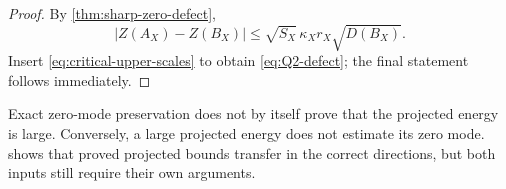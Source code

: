 \begin{proof}
By \cref{thm:sharp-zero-defect},
\[
 |Z(A_X)-Z(B_X)|
 \le
 \sqrt{S_X}\,\kappa_Xr_X\sqrt{D(B_X)}.
\]
Insert \eqref{eq:critical-upper-scales} to obtain
\eqref{eq:Q2-defect}; the final statement follows immediately.
\end{proof}

\begin{remark}
\label{rem:zero-energy-distinct}
Exact zero-mode preservation does not by itself prove that the
projected energy is large.  Conversely, a large projected energy
does not estimate its zero mode.  
shows that proved projected bounds transfer in the correct
directions, but both inputs still require their own arguments.
\end{remark}
